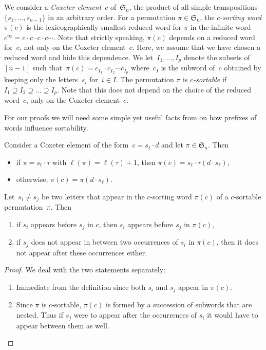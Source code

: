 \documentclass[ALCO]{cedram}
\newcommand{\fS}{\mathfrak{S}}
\newcommand{\defn}[1]{\textsl{\color{darkblue} #1}}
\begin{document}
We consider a \defn{Coxeter element}~$c$ of~$\fS_n$, \ie the product of all simple transpositions $\{s_1, \dots, s_{n-1}\}$ in an arbitrary order.
For a permutation $\pi \in \fS_n$, the \defn{$c$-sorting word} $\pi(c)$ is the lexicographically smallest reduced word for $\pi$ in the infinite word ${c^\infty = c \cdot c \cdot c \cdot c \cdots}$.
Note that strictly speaking, $\pi(c)$ depends on a reduced word for~$c$, not only on the Coxeter element~$c$.
Here, we assume that we have chosen a reduced word and hide this dependence.
We let~$I_1, \dots, I_p$ denote the subsets of~$[n-1]$ such that~$\pi(c) = c_{I_1} \cdot c_{I_2} \cdots c_{I_p}$ where~$c_I$ is the subword of~$c$ obtained by keeping only the letters~$s_i$ for~$i \in I$.
The permutation $\pi$ is \defn{$c$-sortable} if~$I_1 \supseteq I_2 \supseteq \dots \supseteq I_p$.
Note that this does not depend on the choice of the reduced word~$c$, only on the Coxeter element~$c$.

For our proofs we will need some simple yet useful facts from \cite{Reading-sortableElements} on how prefixes of words influence sortability.

\begin{lemma}\label{lem:coxeterElementFacts}
Consider a Coxeter element of the form~$c = s_\ell \cdot d$ and let $\pi \in \fS_n$. Then
\begin{itemize}
	\item if $\pi = s_\ell \cdot \tau$ with $\ell(\pi) = \ell(\tau) + 1$, then $\pi(c) = s_\ell \cdot \tau(d \cdot s_\ell)$,
	\item otherwise, $\pi(c) = \pi(d \cdot s_\ell)$.
\end{itemize}
\end{lemma}

\pagebreak

\begin{lemma}\label{lem:vincent8}
Let~$s_i \ne s_j$ be two letters that appear in the $c$-sorting word $\pi(c)$ of a $c$-sortable permutation~$\pi$. Then
\begin{enumerate} 
	\item if $s_i$ appears before $s_j$ in $c$, then $s_i$ appears before $s_j$ in $\pi(c)$,
	\item if $s_j$ does not appear in between two occurrences of $s_i$ in $\pi(c)$, then it does not appear after these occurrences either.
\end{enumerate}
\end{lemma}

\begin{proof}
We deal with the two statements separately:
	\begin{enumerate} 
		\item Immediate from the definition since both $s_i$ and $s_j$ appear in $\pi(c)$.
		\item Since $\pi$ is $c$-sortable, $\pi(c)$ is formed by a succession of subwords that are nested. Thus if $s_j$ were to appear after the occurrences of $s_i$ it would have to appear between them as well.
		\qedhere
	\end{enumerate}
\end{proof}
\end{document}
